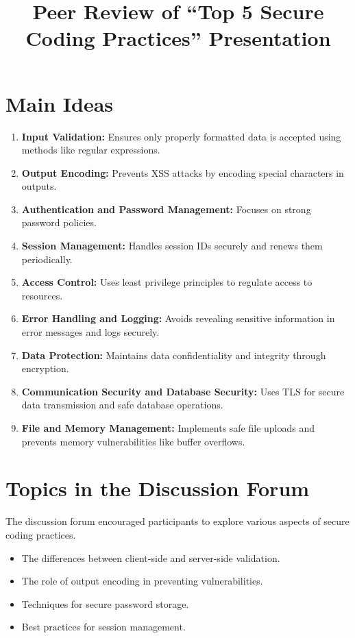 \documentclass{article}
\title{Peer Review of “Top 5 Secure Coding Practices” Presentation}
\author{}
\date{}
\begin{document}
\maketitle

\section{Main Ideas}

\begin{enumerate}
    \item \textbf{Input Validation:} Ensures only properly formatted data is accepted using methods like regular expressions.
    \item \textbf{Output Encoding:} Prevents XSS attacks by encoding special characters in outputs.
    \item \textbf{Authentication and Password Management:} Focuses on strong password policies.
    \item \textbf{Session Management:} Handles session IDs securely and renews them periodically.
    \item \textbf{Access Control:} Uses least privilege principles to regulate access to resources.
    \item \textbf{Error Handling and Logging:} Avoids revealing sensitive information in error messages and logs securely.
    \item \textbf{Data Protection:} Maintains data confidentiality and integrity through encryption.
    \item \textbf{Communication Security and Database Security:} Uses TLS for secure data transmission and safe database operations.
    \item \textbf{File and Memory Management:} Implements safe file uploads and prevents memory vulnerabilities like buffer overflows.
\end{enumerate}

\section{Topics in the Discussion Forum}

The discussion forum encouraged participants to explore various aspects of secure coding practices.

\begin{itemize}
    \item The differences between client-side and server-side validation.
    \item The role of output encoding in preventing vulnerabilities.
    \item Techniques for secure password storage.
    \item Best practices for session management.
\end{itemize}
\end{document}
